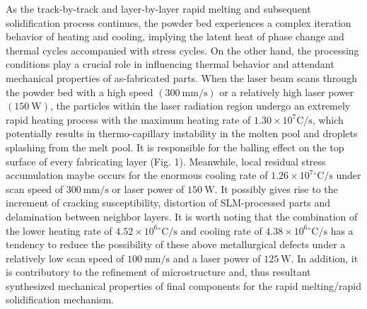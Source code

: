 \documentclass[10pt]{article}
\begin{document}
As the track-by-track and layer-by-layer rapid melting and subsequent solidification process continues, the powder bed experiences a complex iteration behavior of heating and cooling, implying the latent heat of phase change and thermal cycles accompanied with stress cycles. On the other hand, the processing conditions play a crucial role in influencing thermal behavior and attendant mechanical properties of as-fabricated parts. When the laser beam scans through the powder bed with a high speed $(300 \mathrm{~mm} / \mathrm{s})$ or a relatively high laser power $(150 \mathrm{~W})$, the particles within the laser radiation region undergo an extremely rapid heating process with the maximum heating rate of $1.30 \times 10^{7} \mathrm{C} / \mathrm{s}$, which potentially results in thermo-capillary instability in the molten pool and droplets splashing from the melt pool. It is responsible for the balling effect on the top surface of every fabricating layer (Fig. 1). Meanwhile, local residual stress accumulation maybe occurs for the enormous cooling rate of $1.26 \times 10^{7}{ }^{\circ} \mathrm{C} / \mathrm{s}$ under scan speed of $300 \mathrm{~mm} / \mathrm{s}$ or laser power of $150 \mathrm{~W}$. It possibly gives rise to the increment of cracking susceptibility, distortion of SLM-processed parts and delamination between neighbor layers. It is worth noting that the combination of the lower heating rate of $4.52 \times 10^{6}{ }^{\circ} \mathrm{C} / \mathrm{s}$ and cooling rate of $4.38 \times 10^{6}{ }^{\circ} \mathrm{C} / \mathrm{s}$ has a tendency to reduce the possibility of these above metallurgical defects under a relatively low scan speed of $100 \mathrm{~mm} / \mathrm{s}$ and a laser power of $125 \mathrm{~W}$. In addition, it is contributory to the refinement of microstructure and, thus resultant synthesized mechanical properties of final components for the rapid melting/rapid solidification mechanism.
\end{document}
